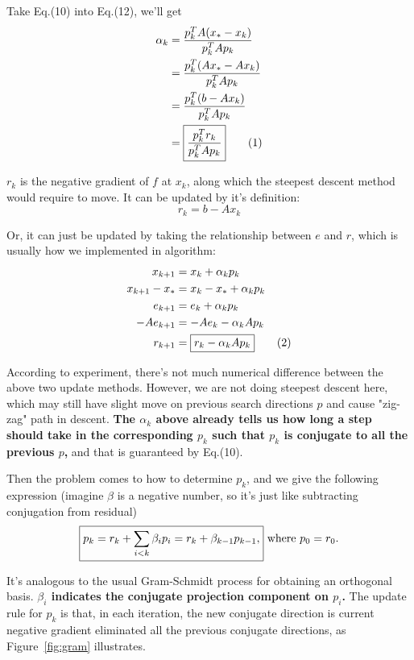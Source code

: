\documentclass{article}
\newcommand\numberthis{\addtocounter{equation}{1}\tag{\theequation}}
\begin{document}
Take Eq.(10) into Eq.(12), we'll get
\begin{align*}
    \alpha_k&=\frac{ p_{k}^TA(x_{*}-x_{k})}{ p_{k}^TA p_{k}}\\ 
    &=\frac{ p_{k}^T(Ax_{*}-Ax_{k})}{ p_{k}^TA p_{k}}\\ 
    &=\frac{ p_{k}^T( b-Ax_{k})}{ p_{k}^TA p_{k}}\\ 
    &=\boxed{\frac{ p_{k}^T r_k}{ p_{k}^TA p_{k}}}\numberthis
\end{align*}

$ r_k$ is the negative gradient of $f$ at $x_k$, along which the steepest descent method would require to move. It can be updated by it's definition:
\begin{equation}
    r_k=\boxed{b-Ax_k}
\end{equation}

Or, it can just be updated by taking the relationship between $e$ and $r$, which is usually how we implemented in algorithm:
\begin{align*}
    x_{k+1}&=x_k+\alpha_kp_k\\ 
    x_{k+1}-x_*&=x_k-x_*+\alpha_kp_k\\ 
    e_{k+1}&=e_k+\alpha_kp_k\\ 
    -Ae_{k+1}&=-Ae_k-\alpha_kAp_k\\
    r_{k+1}&=\boxed{r_k-\alpha_kAp_k} \numberthis
\end{align*}

According to experiment, there's not much numerical difference between the above two update methods.
However, we are not doing steepest descent here, which may still have slight move on previous search directions $p$ and cause "zig-zag" path in descent. \textbf{The $\alpha_k$ above already tells us how long a step should take in the corresponding $p_k$ such that $p_k$ is conjugate to all the previous $p$,} and that is guaranteed by Eq.(10). 

Then the problem comes to how to determine $p_k$, and we give the following expression (imagine $\beta$ is a negative number, so it's just like subtracting conjugation from residual)
\begin{equation}
   \boxed{ p_k= r_k+\sum_{i<k}\beta_i p_i=r_k+\beta_{k-1}p_{k-1},}\text{  where $ p_0= r_0$.}
\end{equation}

 It's analogous to the usual Gram-Schmidt process for obtaining an orthogonal basis. \textbf{$\beta_i$ indicates the conjugate projection component on $p_i$.} The update rule for $p_k$ is that, in each iteration, the new conjugate direction is current negative gradient eliminated all the previous conjugate directions, as Figure~\ref{fig:gram} illustrates. 
 
\end{document}
